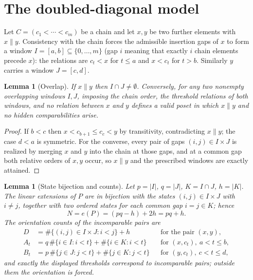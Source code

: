 \documentclass[11pt]{article}
\newtheorem{lemma}[theorem]{Lemma}
\theoremstyle{definition}
\theoremstyle{remark}
\begin{document}
\section{The doubled-diagonal model}
Let $C=(c_1<\cdots<c_m)$ be a chain and let $x,y$ be two further elements with
$x\parallel y$. Consistency with the chain forces the admissible insertion gaps of $x$ to
form a window $I=[a,b]\subseteq\{0,\dots,m\}$ (gap $i$ meaning that exactly $i$ chain
elements precede $x$): the relations are $c_t<x$ for $t\le a$ and $x<c_{t}$ for $t>b$.
Similarly $y$ carries a window $J=[c,d]$.

\begin{lemma}[Overlap]\label{lem:overlap}
If $x\parallel y$ then $I\cap J\neq\emptyset$. Conversely, for any two nonempty
overlapping windows $I,J$, imposing the chain order, the threshold relations of both
windows, and no relation between $x$ and $y$ defines a valid poset in which $x\parallel y$
and no hidden comparabilities arise.
\end{lemma}

\begin{proof}
If $b<c$ then $x<c_{b+1}\le c_c<y$ by transitivity, contradicting $x\parallel y$; the case
$d<a$ is symmetric. For the converse, every pair of gaps $(i,j)\in I\times J$ is realized
by merging $x$ and $y$ into the chain at those gaps, and at a common gap both relative
orders of $x,y$ occur, so $x\parallel y$ and the prescribed windows are exactly attained.
\end{proof}

\begin{lemma}[State bijection and counts]\label{lem:states}
Let $p=|I|$, $q=|J|$, $K=I\cap J$, $h=|K|$. The linear extensions of $P$ are in bijection
with the states $(i,j)\in I\times J$ with $i\ne j$, together with two ordered states for
each common gap $i=j\in K$; hence
\[
N=e(P)=(pq-h)+2h=pq+h.
\]
The orientation counts of the incomparable pairs are
\begin{align*}
D&=\#\{(i,j)\in I\times J: i<j\}+h &&\text{for the pair }(x,y),\\
A_t&=q\,\#\{i\in I: i<t\}+\#\{i\in K: i<t\} &&\text{for }(x,c_t),\ a<t\le b,\\
B_t&=p\,\#\{j\in J: j<t\}+\#\{j\in K: j<t\} &&\text{for }(y,c_t),\ c<t\le d,
\end{align*}
and exactly the displayed thresholds correspond to incomparable pairs; outside them the
orientation is forced.
\end{lemma}
\end{document}
